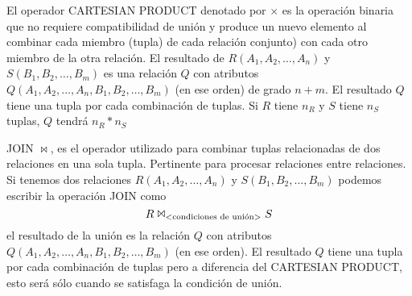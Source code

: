 El operador CARTESIAN PRODUCT denotado por $\times$ es la operación binaria que no requiere compatibilidad de unión y produce un nuevo elemento al combinar cada miembro (tupla) de cada relación conjunto) con cada otro miembro de la otra relación. El resultado de $R(A_1,A_2,\ldots,A_n)$ y $S(B_1,B_2,\ldots,B_m)$ es una relación $Q$ con atributos $Q(A_1,A_2,\ldots,A_n,B_1,B_2,\ldots,B_m)$ (en ese orden) de grado $n+m$. El resultado $Q$ tiene una tupla por cada combinación de tuplas. Si $R$ tiene $n_R$ y $S$ tiene $n_S$ tuplas, $Q$ tendrá $n_R * n_S$


JOIN $\Join$, es el operador utilizado para combinar tuplas relacionadas de dos relaciones en una sola tupla. Pertinente para procesar relaciones entre relaciones. Si tenemos dos relaciones $R(A_1,A_2,\ldots,A_n)$ y $S(B_1,B_2,\ldots,B_m)$ podemos escribir la operación JOIN como
\begin{equation}
R\Join_\text{\textless condiciones de unión\textgreater}S
\end{equation}
el resultado de la unión es la relación $Q$ con atributos $Q(A_1,A_2,\ldots,A_n,B_1,B_2,\ldots,B_m)$ (en ese orden). El resultado $Q$ tiene una tupla por cada combinación de tuplas pero a diferencia del CARTESIAN PRODUCT, esto será sólo cuando se satisfaga la condición de unión.